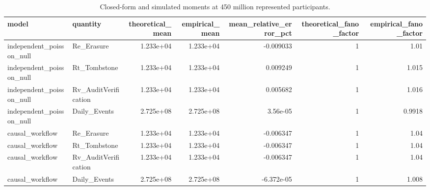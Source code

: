 \begin{table}[t]
\centering
\small
\caption{Closed-form and simulated moments at 450 million represented participants.}
\label{tab:model-validation}
\begin{tabular}{llrrrrr}
\toprule
model & quantity & theoretical\_mean & empirical\_mean & mean\_relative\_error\_pct & theoretical\_fano\_factor & empirical\_fano\_factor \\
\midrule
independent\_poisson\_null & Re\_Erasure & 1.233e+04 & 1.233e+04 & -0.009033 & 1 & 1.01 \\
independent\_poisson\_null & Rt\_Tombstone & 1.233e+04 & 1.233e+04 & 0.009249 & 1 & 1.015 \\
independent\_poisson\_null & Rv\_AuditVerification & 1.233e+04 & 1.233e+04 & 0.005682 & 1 & 1.016 \\
independent\_poisson\_null & Daily\_Events & 2.725e+08 & 2.725e+08 & 3.56e-05 & 1 & 0.9918 \\
causal\_workflow & Re\_Erasure & 1.233e+04 & 1.233e+04 & -0.006347 & 1 & 1.04 \\
causal\_workflow & Rt\_Tombstone & 1.233e+04 & 1.233e+04 & -0.006347 & 1 & 1.04 \\
causal\_workflow & Rv\_AuditVerification & 1.233e+04 & 1.233e+04 & -0.006347 & 1 & 1.04 \\
causal\_workflow & Daily\_Events & 2.725e+08 & 2.725e+08 & -6.372e-05 & 1 & 1.008 \\
\bottomrule
\end{tabular}
\end{table}

